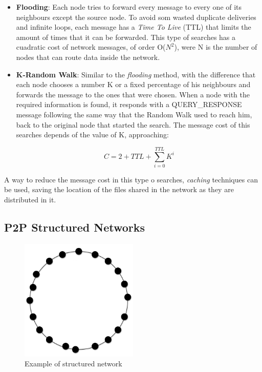 \begin{itemize}
    \item \textbf{Flooding}: 
Each node tries to forward every message to every one of its neighbours except
the source node. To avoid som wasted duplicate deliveries and infinite loops,
each message has a \textit{Time To Live} (TTL) that limits the amount of times
that it can be forwarded. This type of searches has a cuadratic cost of network
messages, of order O($N^2$), were N is the number of nodes that can route data
inside the network.
    \item \textbf{K-Random Walk}: Similar to the \textit{flooding} method, with
the difference that each node chooses a number K or a fixed percentage of his
neighbours and forwards the message to the ones that were chosen. When a node
with the required information is found, it responds with a QUERY\_RESPONSE
message following the same way that the Random Walk used to reach him, back to
the original node that started the search. The message cost of this searches
depends of the value of K, approaching:

\begin{equation}
\label{eq:krandomwalk}
 C = 2 + TTL +
\sum_{i=0}^{TTL} K^i
\end{equation}

\end{itemize}

A way to reduce the message cost in this type o searches, \textit{caching}
techniques can be used, saving the location of the files shared in the network
as they are distributed in it.

\subsection{P2P Structured Networks}
\label{sec:p2p_estructured}

\begin{figure}
\center
\includegraphics[width=0.5\textwidth]{img/p2p-structured}
\caption{Example of structured network}
\label{fig:p2p_estructured}
\end{figure}


